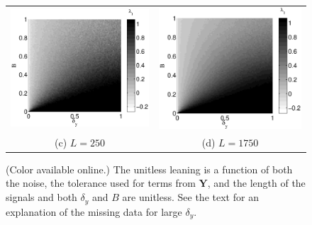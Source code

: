 \documentclass[twocolumn,aps,pre,groupedaddress]{revtex4-1}
\begin{document}
\begin{figure}[ht]
\begin{tabular}{cc}
\includegraphics[scale=0.30]{SimpleIRexample_diffLpart3.eps} &
\includegraphics[scale=0.30]{SimpleIRexample_diffLpart4.eps} \\
(c) $L=250$ & (d) $L=1750$ \\
\end{tabular}
\caption{(Color available online.) The unitless leaning is a function of both the noise, the tolerance used for terms from $\mathbf{Y}$, and the length of the signals and both $\delta_y$ and $B$ are unitless.  See the text for an explanation of the missing data for large $\delta_y$.}
\label{fig:IRexChangeL}
\end{figure}
\end{document}

